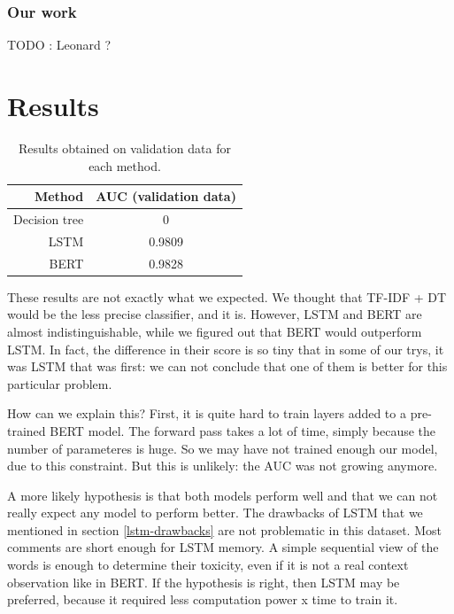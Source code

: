 \documentclass[11pt]{scrartcl}
\begin{document}
\subsubsection{Our work}

TODO : Leonard ?

\section{Results}


\begin{table}[H]
\begin{center}
\begin{tabular}{| r | c |}
\hline
Method & AUC (validation data) \\ \hline \hline
Decision tree & 0 \\ \hline
LSTM & 0.9809 \\ \hline
BERT & 0.9828 \\ \hline
\end{tabular}
\end{center}
\caption{\label{tab:result-table}Results obtained on validation data for each method.}
\end{table}

These results are not exactly what we expected. We thought that TF-IDF + DT would be the less precise classifier, and it is. However, LSTM and BERT are almost indistinguishable, while we figured out that BERT would outperform LSTM. In fact, the difference in their score is so tiny that in some of our trys, it was LSTM that was first: we can not conclude that one of them is better for this particular problem.

How can we explain this? First, it is quite hard to train layers added to a pre-trained BERT model. The forward pass takes a lot of time, simply because the number of parameteres is huge. So we may have not trained enough our model, due to this constraint. But this is unlikely: the AUC was not growing anymore.

A more likely hypothesis is that both models perform well and that we can not really expect any model to perform better. The drawbacks of LSTM that we mentioned in section \ref{lstm-drawbacks} are not problematic in this dataset. Most comments are short enough for LSTM memory. A simple sequential view of the words is enough to determine their toxicity, even if it is not a real context observation like in BERT. If the hypothesis is right, then LSTM may be preferred, because it required less computation power x time to train it.



\appendix
\end{document}

